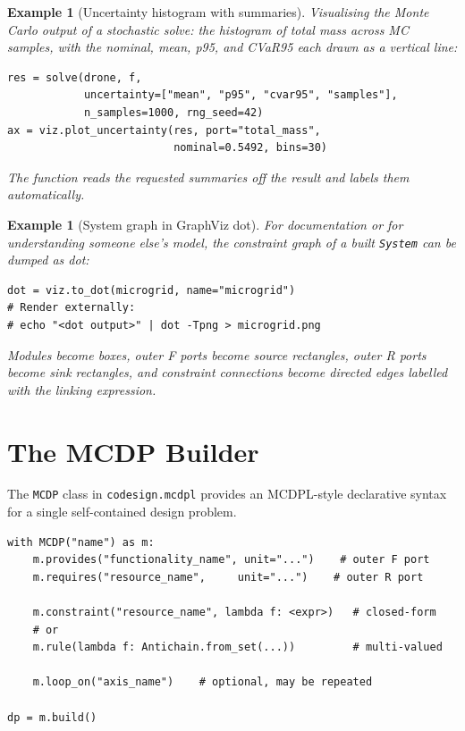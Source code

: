 \documentclass[11pt,a4paper]{article}
\newtheorem{example}[definition]{Example}
\begin{document}
\begin{example}[Uncertainty histogram with summaries]
Visualising the Monte Carlo output of a stochastic solve: the
histogram of total mass across MC samples, with the nominal, mean,
p95, and CVaR95 each drawn as a vertical line:
\begin{lstlisting}
res = solve(drone, f,
            uncertainty=["mean", "p95", "cvar95", "samples"],
            n_samples=1000, rng_seed=42)
ax = viz.plot_uncertainty(res, port="total_mass",
                          nominal=0.5492, bins=30)
\end{lstlisting}
The function reads the requested summaries off the result and
labels them automatically.
\end{example}

\begin{example}[System graph in GraphViz dot]
For documentation or for understanding someone else's model, the
constraint graph of a built \texttt{System} can be dumped as dot:
\begin{lstlisting}
dot = viz.to_dot(microgrid, name="microgrid")
# Render externally:
# echo "<dot output>" | dot -Tpng > microgrid.png
\end{lstlisting}
Modules become boxes, outer F ports become source rectangles,
outer R ports become sink rectangles, and constraint connections
become directed edges labelled with the linking expression.
\end{example}

\section{The MCDP Builder}
\label{sec:mcdp-builder}

The \texttt{MCDP} class in \texttt{codesign.mcdpl} provides an
MCDPL-style declarative syntax for a single self-contained design
problem.

\begin{lstlisting}
with MCDP("name") as m:
    m.provides("functionality_name", unit="...")    # outer F port
    m.requires("resource_name",     unit="...")    # outer R port

    m.constraint("resource_name", lambda f: <expr>)   # closed-form
    # or
    m.rule(lambda f: Antichain.from_set(...))         # multi-valued

    m.loop_on("axis_name")    # optional, may be repeated

dp = m.build()
\end{lstlisting}
\end{document}
